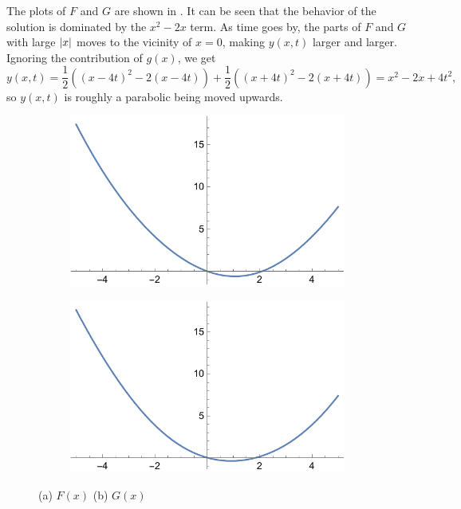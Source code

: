 \documentclass[hyperref, a4paper]{article}
\begin{document}
The plots of $F$ and $G$ are shown in .
It can be seen that the behavior of the solution is dominated by the $x^2 - 2x$ term.
As time goes by, 
the parts of $F$ and $G$ with large $\abs{x}$ moves to the vicinity of $x = 0$,
making $y(x, t)$ larger and larger.
Ignoring the contribution of $g(x)$, we get 
\begin{equation}
    y(x, t) = \frac{1}{2} ((x - 4t)^2 - 2 (x - 4t)) + \frac{1}{2} ((x + 4t)^2 - 2 (x + 4t))
    = x^2 - 2 x + 4 t^2,
\end{equation}
so $y(x, t)$ is roughly a parabolic being moved upwards.

\begin{figure}
    \centering
    \begin{subfigure}{0.45\textwidth}
        \includegraphics[width=\textwidth]{plots/wave-f-1.pdf}
        \subcaption{}
    \end{subfigure}
    \begin{subfigure}{0.45\textwidth}
        \includegraphics[width=\textwidth]{plots/wave-g-1.pdf}
        \subcaption{}
    \end{subfigure}
    \caption{(a) $F(x)$ (b) $G(x)$}
    \label{fig:plot-1} 
\end{figure}
\end{document}
